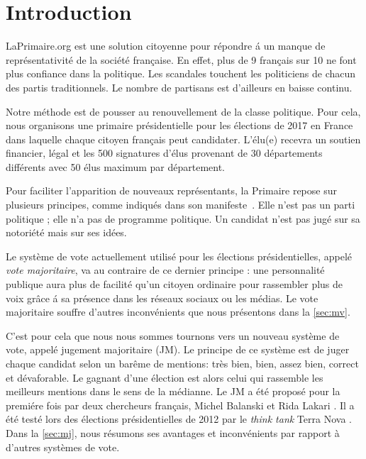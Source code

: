 \documentclass[conference]{IEEEtran}
\begin{document}



\section{Introduction}
\label{sec:intro}


LaPrimaire.org est une solution citoyenne pour r\'epondre \'a un manque de repr\'esentativit\'e de la soci\'et\'e fran\c{c}aise. En effet, plus de 9 fran\c{c}ais sur 10 ne font plus confiance dans la politique. Les scandales touchent les politiciens de chacun des partis traditionnels. Le nombre de partisans est d'ailleurs en baisse continu.


Notre m\'ethode est de pousser au renouvellement de la classe politique. Pour cela, nous organisons une primaire pr\'esidentielle pour les \'elections de 2017 en France dans laquelle chaque citoyen fran\c{c}ais peut candidater. L'\'elu(e) recevra un soutien financier, l\'egal et les 500 signatures d'\'elus provenant de 30 d\'epartements diff\'erents avec 50 \'elus maximum par d\'epartement.

Pour faciliter l'apparition de nouveaux repr\'esentants, la Primaire repose sur plusieurs principes, comme indiqu\'es dans son manifeste~\cite{manifeste}. Elle n'est pas un parti politique ; elle n'a pas de programme politique. Un candidat n'est pas jug\'e sur sa notori\'et\'e mais sur ses id\'ees.

Le syst\`eme de vote actuellement utilis\'e pour les \'elections pr\'esidentielles, appel\'e \emph{vote majoritaire}, va au contraire de ce dernier principe : une personnalit\'e publique aura plus de facilit\'e qu'un citoyen ordinaire pour rassembler plus de voix gr\^ace \'a sa pr\'esence dans les r\'eseaux sociaux ou les m\'edias. Le vote majoritaire souffre d'autres inconv\'enients que nous pr\'esentons dans la \cref{sec:mv}. 

C'est pour cela que nous nous sommes tournons vers un nouveau syst\`eme de vote, appel\'e jugement majoritaire (JM). Le principe de ce syst\`eme est de juger chaque candidat selon un bar\^eme de mentions: tr\`es bien, bien, assez bien, correct et d\'evaforable. Le gagnant d'une \'election est alors celui qui rassemble les meilleurs mentions dans le sens de la m\'edianne.  Le JM a \'et\'e propos\'e pour la premi\'ere fois par deux chercheurs fran\c{c}ais, Michel Balanski et Rida Lakari \cite{mj}.  Il a \'et\'e test\'e lors des \'elections pr\'esidentielles de 2012 par le \emph{think tank} Terra Nova \cite{terra-nova}. Dans la \cref{sec:mj}, nous r\'esumons ses avantages et inconv\'enients par rapport \`a d'autres syst\`emes de vote. 
\end{document}

